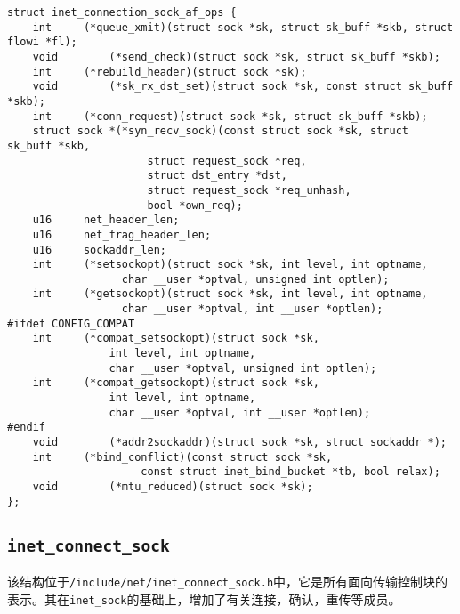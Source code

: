 \begin{verbatim}
struct inet_connection_sock_af_ops {
    int     (*queue_xmit)(struct sock *sk, struct sk_buff *skb, struct flowi *fl);
    void        (*send_check)(struct sock *sk, struct sk_buff *skb);
    int     (*rebuild_header)(struct sock *sk);
    void        (*sk_rx_dst_set)(struct sock *sk, const struct sk_buff *skb);
    int     (*conn_request)(struct sock *sk, struct sk_buff *skb);
    struct sock *(*syn_recv_sock)(const struct sock *sk, struct sk_buff *skb,
                      struct request_sock *req,
                      struct dst_entry *dst,
                      struct request_sock *req_unhash,
                      bool *own_req);
    u16     net_header_len;
    u16     net_frag_header_len;
    u16     sockaddr_len;
    int     (*setsockopt)(struct sock *sk, int level, int optname, 
                  char __user *optval, unsigned int optlen);
    int     (*getsockopt)(struct sock *sk, int level, int optname, 
                  char __user *optval, int __user *optlen);
#ifdef CONFIG_COMPAT
    int     (*compat_setsockopt)(struct sock *sk,
                int level, int optname,
                char __user *optval, unsigned int optlen);
    int     (*compat_getsockopt)(struct sock *sk,
                int level, int optname,
                char __user *optval, int __user *optlen);
#endif
    void        (*addr2sockaddr)(struct sock *sk, struct sockaddr *);
    int     (*bind_conflict)(const struct sock *sk,
                     const struct inet_bind_bucket *tb, bool relax);
    void        (*mtu_reduced)(struct sock *sk);
};
\end{verbatim}

        \subsection{\texttt{inet_connect_sock}}

            该结构位于\texttt{/include/net/inet_connect_sock.h}中，它是所有面向传输控制块的表示。其在\texttt{inet_sock}的基础上，增加了有关连接，确认，重传等成员。
            
